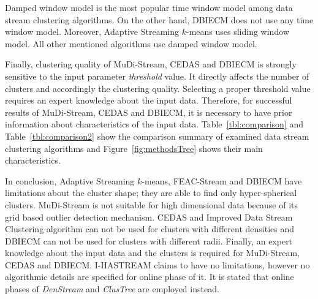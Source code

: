\documentclass[smallcondensed]{svjour3}     %
\begin{document}
Damped window model is the most popular time window model among data stream clustering algorithms. On the other hand, DBIECM does not use any time window model. Moreover, Adaptive Streaming $k$-means uses sliding window model. All other mentioned algorithms use damped window model. 

Finally, clustering quality of MuDi-Stream, CEDAS and DBIECM is strongly sensitive to the input parameter \textit{threshold} value. It directly affects the number of clusters and accordingly the clustering quality. Selecting a proper threshold value requires an expert knowledge about the input data. Therefore, for successful results of MuDi-Stream, CEDAS and DBIECM, it is necessary to have prior information about characteristics of the input data. Table~\ref{tbl:comparison} and Table~\ref{tbl:comparison2} show the comparison summary of examined data stream clustering algorithms and Figure~\ref{fig:methodsTree} shows their main characteristics.

In conclusion, Adaptive Streaming $k$-means, FEAC-Stream and DBIECM have limitations about the cluster shape; they are able to find only hyper-spherical clusters. MuDi-Stream is not suitable for high dimensional data because of its grid based outlier detection mechanism. CEDAS and Improved Data Stream Clustering algorithm can not be used for clusters with different densities and DBIECM can not be used for clusters with different radii. Finally, an expert knowledge about the input data and the clusters is required for MuDi-Stream, CEDAS and DBIECM. I-HASTREAM claims to have no limitations, however no algorithmic details are specified for online phase of it. It is stated that online phases of \textit{DenStream} and \textit{ClusTree} are employed instead.

%
\end{document}
